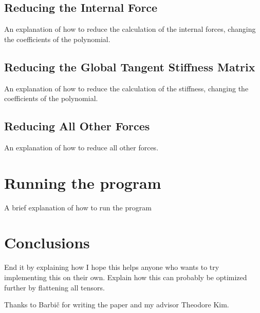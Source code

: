 \documentclass[twocolumn,10pt]{asme2ej}
\begin{document}
\subsection{Reducing the Internal Force}

An explanation of how to reduce the calculation of the internal forces, changing the coefficients
of the polynomial.

\subsection{Reducing the Global Tangent Stiffness Matrix}

An explanation of how to reduce the calculation of the stiffness, changing the coefficients
of the polynomial.

\subsection{Reducing All Other Forces}

An explanation of how to reduce all other forces.

\section{Running the program}

A brief explanation of how to run the program

\section{Conclusions}

End it by explaining how I hope this helps anyone who wants to try implementing this on their own.
Explain how this can probably be optimized further by flattening all tensors.

\begin{acknowledgment}

Thanks to Barbič for writing the paper and my advisor Theodore Kim.

\end{acknowledgment}

\end{document}
